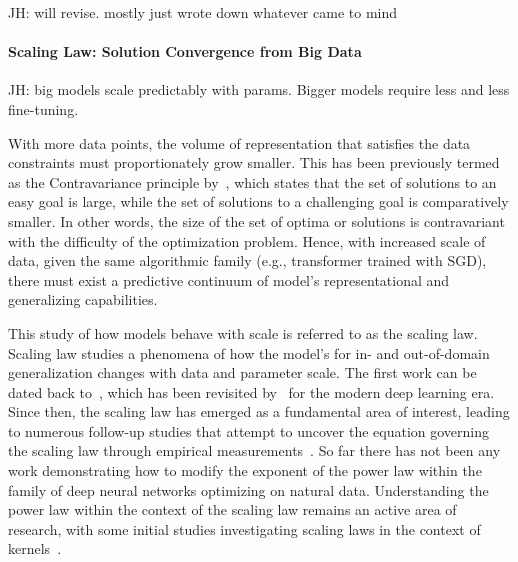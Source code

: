 \documentclass{article}
\newcommand{\jh}[1]{{\;\color{red}JH: #1}}
\theoremstyle{plain}
\theoremstyle{definition}
\theoremstyle{remark}
\begin{document}
\jh{will revise. mostly just wrote down whatever came to mind}

\paragraph{Scaling Law: Solution Convergence from Big Data}
\jh{big models scale predictably with params. Bigger models require less and less fine-tuning.}

With more data points, the volume of representation that satisfies the data constraints must proportionately grow smaller. This has been previously termed as the Contravariance principle by~\cite{cao2021explanatory}, which states that the set of solutions to an easy goal is large, while the set of solutions to a challenging goal is comparatively smaller. In other words, the size of the set of optima or solutions is contravariant with the difficulty of the optimization problem. Hence, with increased scale of data, given the same algorithmic family (e.g., transformer trained with SGD), there must exist a predictive continuum of model's representational and generalizing capabilities.

This study of how models behave with scale is referred to as the scaling law. Scaling law studies a phenomena of how the model's for in- and out-of-domain generalization changes with data and parameter scale.
The first work can be dated back to~\cite{cortes1993learning}, which has been revisited by~\cite{hestness2017deep} for the modern deep learning era. Since then, the scaling law has emerged as a fundamental area of interest, leading to numerous follow-up studies that attempt to uncover the equation governing the scaling law through empirical measurements~\cite{rosenfeld2019constructive,kaplan2020scaling,hoffmann2022training}. So far there has not been any work demonstrating how to modify the exponent of the power law within the family of deep neural networks optimizing on natural data. Understanding the power law within the context of the scaling law remains an active area of research, with some initial studies investigating scaling laws in the context of kernels~\cite{bahri2021explaining}. 
\end{document}
